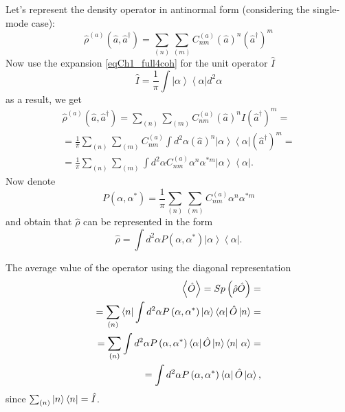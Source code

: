 Let's represent the density operator in antinormal form (considering the single-mode case): 
\begin{equation}
\hat{\rho}^{\left(a\right)}\left(\hat{a},\hat{a}^{\dag}\right) = 
\sum_{(n)}\sum_{(m)}C^{\left(a\right)}_{nm}\left(\hat{a}\right)^n\left(\hat{a}^{\dag}\right)^m
\end{equation}
Now use the expansion \eqref{eqCh1_full4coh} for the unit operator $\hat{I}$
\[
\hat{I} = \frac{1}{\pi}\int \left|\alpha\right>\left<\alpha\right| d^2 \alpha
\]
as a result, we get
\begin{eqnarray}
\hat{\rho}^{\left(a\right)}\left(\hat{a},\hat{a}^{\dag}\right) = 
\sum_{(n)}\sum_{(m)}C^{\left(a\right)}_{nm}\left(\hat{a}\right)^n\hat{I}\left(\hat{a}^{\dag}\right)^m
= 
\nonumber \\
= \frac{1}{\pi}\sum_{(n)}\sum_{(m)}C^{\left(a\right)}_{nm}\int d^2 \alpha
\left(\hat{a}\right)^n
\left|\alpha\right>\left<\alpha\right|
\left(\hat{a}^{\dag}\right)^m = 
\nonumber \\
= \frac{1}{\pi}\sum_{(n)}\sum_{(m)}\int d^2 \alpha
C^{\left(a\right)}_{nm}
\alpha^n
\alpha^{*m}
\left|\alpha\right>\left<\alpha\right|.
\end{eqnarray}
Now denote 
\[
P\left(\alpha, \alpha^{*}\right) = \frac{1}{\pi}\sum_{(n)}\sum_{(m)}
C^{\left(a\right)}_{nm}
\alpha^n
\alpha^{*m}
\]
and obtain that $\hat{\rho}$ can be represented in the form
\begin{equation}
\hat{\rho} = \int d^2 \alpha P\left(\alpha, \alpha^{*}\right) 
\left|\alpha\right>\left<\alpha\right|.
\label{eqCh1_Rho_in_alpha}
\end{equation}

The average value of the operator using the diagonal representation 
\begin{eqnarray}
\left<\hat{O}\right> = Sp \left(\hat{\rho}\hat{O}\right) =
\nonumber \\
= \sum_{(n)}\bra{n}
\int d^2 \alpha P\left(\alpha, \alpha^{*}\right) 
\left|\alpha\right>\left<\alpha\right|
\hat{O}\ket{n} =
\nonumber \\
= \sum_{(n)} \int d^2 \alpha P\left(\alpha, \alpha^{*}\right)
\left<\alpha\right|\hat{O}\ket{n}
\bra{n}\left.\alpha\right> = 
\nonumber \\
=  
\int d^2 \alpha P\left(\alpha, \alpha^{*}\right)
\left<\alpha\right|\hat{O}\left|\alpha\right>,
\label{eqCh1_middleO}
\end{eqnarray}
since $\sum_{(n)}\ket{n}\bra{n} = \hat{I}$. 

